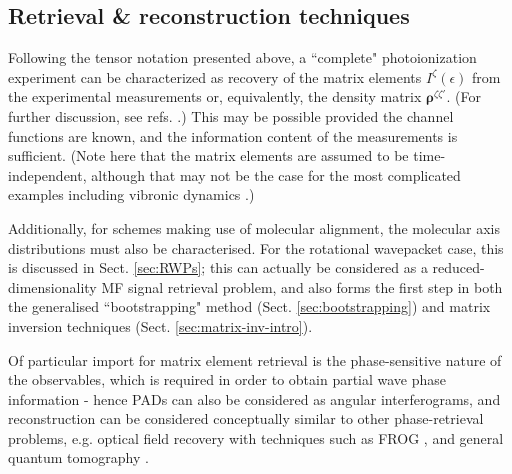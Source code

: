 \documentclass[10pt]{article}
\begin{document}





\subsection{Retrieval \& reconstruction techniques\label{sec:recon-techniques-intro}}


Following the tensor notation presented above, a ``complete" photoionization experiment can be characterized as recovery of the matrix elements $I^{\zeta}(\epsilon)$ from the experimental measurements or, equivalently, the density matrix $\mathbf{\rho}^{\zeta\zeta'}$. (For further discussion, see refs. \cite{Reid2003,kleinpoppen2013perfect,hockett2018QMP1}.) This may be possible provided the channel functions are known, and the information content of the measurements is sufficient. (Note here that the matrix elements are assumed to be time-independent, although that may not be the case for the most complicated examples including vibronic dynamics \cite{hockett2018QMP2}.) 

Additionally, for schemes making use of molecular alignment, the molecular axis distributions must also be characterised. For the rotational wavepacket case, this is discussed in Sect. \ref{sec:RWPs}; this can actually be considered as a reduced-dimensionality MF signal retrieval problem, and also forms the first step in both the generalised ``bootstrapping" method (Sect. \ref{sec:bootstrapping}) and matrix inversion techniques (Sect. \ref{sec:matrix-inv-intro}).

Of particular import for matrix element retrieval is the phase-sensitive nature of the observables, which is required in order to obtain partial wave phase information - hence PADs can also be considered as angular interferograms, and reconstruction can be considered conceptually similar to other phase-retrieval problems, e.g. optical field recovery with techniques such as FROG \cite{trebino2000FrequencyResolvedOpticalGating}, and general quantum tomography \cite{MauroDAriano2003}. 
\end{document}
